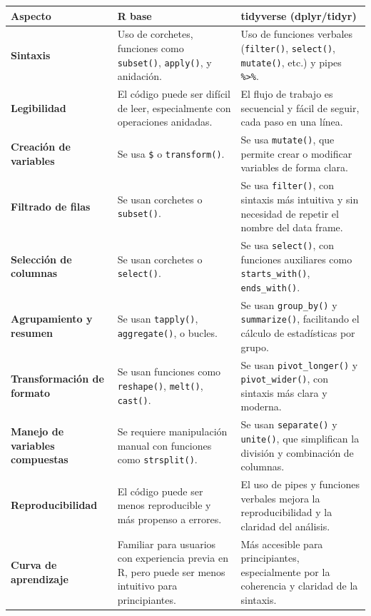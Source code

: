 \documentclass[
  spanish,
  a4paper,
  DIV=11,
  numbers=noendperiod,
  onepage,
  openany]{scrreprt}
\begin{document}
\begin{longtable}[]{@{}
  >{\raggedright\arraybackslash}p{}
  >{\raggedright\arraybackslash}p{}
  >{\raggedright\arraybackslash}p{}@{}}
\toprule\noalign{}
\begin{minipage}[b]{\linewidth}\raggedright
Aspecto
\end{minipage} & \begin{minipage}[b]{\linewidth}\raggedright
R base
\end{minipage} & \begin{minipage}[b]{\linewidth}\raggedright
tidyverse (dplyr/tidyr)
\end{minipage} \\
\midrule\noalign{}
\endhead
\bottomrule\noalign{}
\endlastfoot
\textbf{Sintaxis} & Uso de corchetes, funciones como \texttt{subset()},
\texttt{apply()}, y anidación. & Uso de funciones verbales
(\texttt{filter()}, \texttt{select()}, \texttt{mutate()}, etc.) y pipes
\texttt{\%\textgreater{}\%}. \\
\textbf{Legibilidad} & El código puede ser difícil de leer,
especialmente con operaciones anidadas. & El flujo de trabajo es
secuencial y fácil de seguir, cada paso en una línea. \\
\textbf{Creación de variables} & Se usa \texttt{\$} o
\texttt{transform()}. & Se usa \texttt{mutate()}, que permite crear o
modificar variables de forma clara. \\
\textbf{Filtrado de filas} & Se usan corchetes o \texttt{subset()}. & Se
usa \texttt{filter()}, con sintaxis más intuitiva y sin necesidad de
repetir el nombre del data frame. \\
\textbf{Selección de columnas} & Se usan corchetes o \texttt{select()}.
& Se usa \texttt{select()}, con funciones auxiliares como
\texttt{starts\_with()}, \texttt{ends\_with()}. \\
\textbf{Agrupamiento y resumen} & Se usan \texttt{tapply()},
\texttt{aggregate()}, o bucles. & Se usan \texttt{group\_by()} y
\texttt{summarize()}, facilitando el cálculo de estadísticas por
grupo. \\
\textbf{Transformación de formato} & Se usan funciones como
\texttt{reshape()}, \texttt{melt()}, \texttt{cast()}. & Se usan
\texttt{pivot\_longer()} y \texttt{pivot\_wider()}, con sintaxis más
clara y moderna. \\
\textbf{Manejo de variables compuestas} & Se requiere manipulación
manual con funciones como \texttt{strsplit()}. & Se usan
\texttt{separate()} y \texttt{unite()}, que simplifican la división y
combinación de columnas. \\
\textbf{Reproducibilidad} & El código puede ser menos reproducible y más
propenso a errores. & El uso de pipes y funciones verbales mejora la
reproducibilidad y la claridad del análisis. \\
\textbf{Curva de aprendizaje} & Familiar para usuarios con experiencia
previa en R, pero puede ser menos intuitivo para principiantes. & Más
accesible para principiantes, especialmente por la coherencia y claridad
de la sintaxis. \\
\end{longtable}
\end{document}
